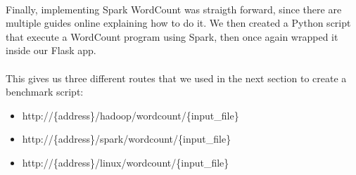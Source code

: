 \paragraph{}Finally, implementing Spark WordCount was straigth forward, since there are multiple guides online explaining how to do it. We then created a Python script that execute a WordCount program using Spark, then once again wrapped it inside our Flask app.

\paragraph{}This gives us three different routes that we used in the next section to create a benchmark script:

\begin{itemize}
  \item http://\{address\}/hadoop/wordcount/\{input\_file\}
  \item http://\{address\}/spark/wordcount/\{input\_file\}
  \item http://\{address\}/linux/wordcount/\{input\_file\}
\end{itemize}
\pagebreak












